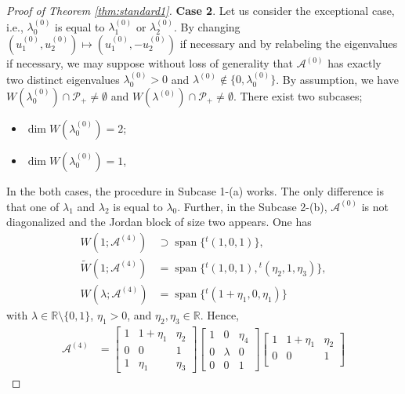 \documentclass[11pt,a4paper,twosides]{amsart}
\theoremstyle{plain}
\theoremstyle{remark}
\numberwithin{equation}{section}
\newcommand{\R}{\mathbb{R}}
\DeclareMathOperator{\Span}{span}
\theoremstyle{definition}
\newcommand{\1}{{\bf 1}_{\{|x| < |t|\}}}
\renewcommand{\tilde}{\widetilde}
\begin{document}
\begin{proof}[Proof of Theorem \ref{thm:standard1}]
{\bf Case 2}.
Let us consider the exceptional case, i.e.,
$\lambda_0^{(0)}$ is equal to
$\lambda_1^{(0)}$ or $\lambda_2^{(0)}$.
By changing $(u_1^{(0)},u_2^{(0)})\mapsto (u_1^{(0)},-u_2^{(0)})$ if necessary and
 by relabeling the eigenvalues if necessary, we may suppose  without loss of generality that 
$\mathscr{A}^{(0)}$ has exactly two distinct eigenvalues $\lambda_0^{(0)}>0$ and $\lambda^{(0)}\not \in \{ 0, \lambda_0^{(0)}\}$. By assumption, we have
$W(\lambda_0^{(0)}) \cap \mathcal{P}_+\neq \emptyset$ and $W(\lambda^{(0)}) \cap \mathcal{P}_+\neq \emptyset$.
There exist two subcases;
\begin{itemize}
\item[(a)] $\dim W(\lambda_0^{(0)}) =2$;
\item[(b)] $\dim W(\lambda_0^{(0)}) =1$, \end{itemize}
%
In the both cases, the procedure in Subcase 1-(a) works.
The only difference is that one of $\lambda_1$ and $\lambda_2$ is equal to $\lambda_0$.
Further, in the Subcase 2-(b),
$\mathscr{A}^{(0)}$ is not diagonalized and
the Jordan block of size two appears.
One has
\begin{align*}
	W(1;\mathscr{A}^{(4)}) 
	&\supset \Span \{{}^t\!(1,0,1) \}, \\
	\tilde{W}(1;\mathscr{A}^{(4)}) 
	&= \Span \{{}^t\!(1,0,1), {}^t\!(\eta_2,1,\eta_3) \}, \\
	W(\lambda;\mathscr{A}^{(4)}) 
	&= \Span \{{}^t\!(1+\eta_1,0,\eta_1) \}
\end{align*}
with $\lambda \in \R\setminus\{0,1\}
$, $\eta_1>0$, and $\eta_2,\eta_3\in \R$.
Hence, 
\begin{align*}
	\mathscr{A}^{(4)}
	&= \begin{bmatrix}
	1 & 1+\eta_1 & \eta_2 \\
	0 & 0& 1\\
	1 & \eta_1& \eta_3
	\end{bmatrix}
	\begin{bmatrix}
	1 & 0 & \eta_4 \\
	0 & \lambda & 0\\
	0 & 0 & 1
	\end{bmatrix}
	\begin{bmatrix}
	1 & 1+\eta_1 & \eta_2 \\
	0 & 0& 1\\

\end{bmatrix}
\end{align*}
\end{proof}
\end{document}
